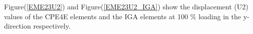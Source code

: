 \documentclass[11pt]{article}
\begin{document}
\noindent
Figure(\ref{EME23U2}) and Figure(\ref{EME23U2_IGA}) show the displacement (U2) values of the CPE4E elements and the IGA elements at 100 \% loading in the y-direction respectively. \\

\end{document}
